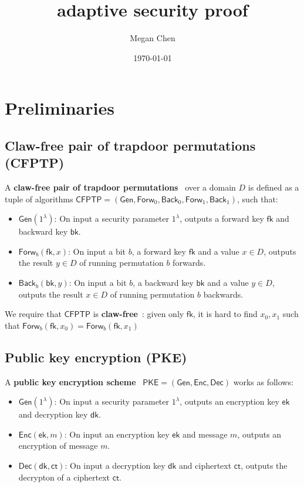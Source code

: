 \documentclass[11pt,letterpaper]{article}
\title{\cite{CanettiF01} adaptive security proof}
\author{Megan Chen}
\date{\today}
\renewcommand{\emph}[1]{\textbf{#1}~}
\newcommand{\doclearpage}{%
  \iffull\clearpage\else\fi
}
\theoremstyle{plain} %
\theoremstyle{definition} %
\theoremstyle{remark} %
\newcommand{\Input}{x}
\newcommand{\SecParam}{\lambda}
\newcommand{\PKE}{\mathsf{PKE}}
\newcommand{\Gen}{\mathsf{Gen}}
\newcommand{\Enc}{\mathsf{Enc}}
\newcommand{\Dec}{\mathsf{Dec}}
\newcommand{\EncKey}{\mathsf{ek}}
\newcommand{\DecKey}{\mathsf{dk}}
\newcommand{\Msg}{m}
\newcommand{\Ct}{\mathsf{ct}}
\newcommand{\CFPTP}{\mathsf{CFPTP}}
\newcommand{\Forw}{\mathsf{Forw}}
\newcommand{\Back}{\mathsf{Back}}
\newcommand{\ForwKey}{\mathsf{fk}}
\newcommand{\BackKey}{\mathsf{bk}}
\newcommand{\Domain}{D}
\newcommand{\CFPTPInput}{\Input}
\newcommand{\Output}{y}
\newcommand{\CFPTPBit}{b}
\begin{document}
\maketitle
\tableofcontents

\doclearpage
\section{Preliminaries}
\label{sec:preliminaries}

\subsection{Claw-free pair of trapdoor permutations (CFPTP)}
A \emph{claw-free pair of trapdoor permutations} over a domain $\Domain$ is defined as a tuple of algorithms $\CFPTP = (\Gen, \Forw_0, \Back_0, \Forw_1, \Back_1)$, such that:
\begin{itemize}
	\item $\Gen(1^\SecParam)$: On input a security parameter $1^\SecParam$, outputs a forward key $\ForwKey$ and backward key $\BackKey$.
	\item $\Forw_{\CFPTPBit}(\ForwKey, \CFPTPInput)$: On input a bit $\CFPTPBit$, a forward key $\ForwKey$ and a value $\Input \in \Domain$, outputs the result $\Output \in \Domain$ of running permutation $\CFPTPBit$ forwards.
	\item $\Back_{\CFPTPBit}(\BackKey, \Output)$: On input a bit $\CFPTPBit$, a backward key $\BackKey$ and a value $\Output \in \Domain$, outputs the result $\Input \in \Domain$ of running permutation $b$ backwards.
\end{itemize}

We require that $\CFPTP$ is \emph{claw-free}: given only $\ForwKey$, it is hard to find $\CFPTPInput_0, \CFPTPInput_1$ such that $\Forw_{\CFPTPBit}(\ForwKey,\CFPTPInput_0) = \Forw_{\CFPTPBit}(\ForwKey,\CFPTPInput_1)$

\subsection{Public key encryption (PKE)}

A \emph{public key encryption scheme} $\PKE = (\Gen, \Enc, \Dec)$ works as follows:
\begin{itemize}
	\item $\Gen(1^\SecParam)$: On input a security parameter $1^\SecParam$, outputs an encryption key $\EncKey$ and decryption key $\DecKey$.
	\item $\Enc(\EncKey,\Msg)$: On input an encryption key $\EncKey$ and message $\Msg$, outputs an encryption of message $\Msg$.
	\item $\Dec(\DecKey,\Ct)$: On input a decryption key $\DecKey$ and ciphertext $\Ct$, outputs the decrypton of a ciphertext $\Ct$.
\end{itemize}
\end{document}
